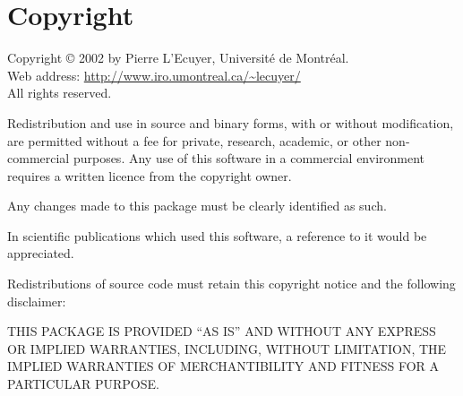 \section*{Copyright}
 
  Copyright \copyright {} 2002 by Pierre L'Ecuyer,
    Universit\'e de Montr\'eal.\\
  Web address:   \url{http://www.iro.umontreal.ca/~lecuyer/} \\
  All rights reserved.
 
\noindent  Redistribution and use in source and binary forms, with or without
  modification, are permitted without a fee for private, research,
  academic, or other non-commercial purposes.
  Any use of this software in a commercial environment requires a
  written licence from the copyright owner.
 
\noindent  Any changes made to this package must be clearly identified as such.
 
\noindent  In scientific publications which used this software, a reference to it
  would be appreciated.
 
\noindent  Redistributions of source code must retain this copyright notice
  and the following disclaimer:
 
\noindent  THIS PACKAGE IS PROVIDED ``AS IS'' AND WITHOUT ANY EXPRESS OR
  IMPLIED WARRANTIES, INCLUDING, WITHOUT LIMITATION, THE IMPLIED
  WARRANTIES OF MERCHANTIBILITY AND FITNESS FOR A PARTICULAR PURPOSE.
